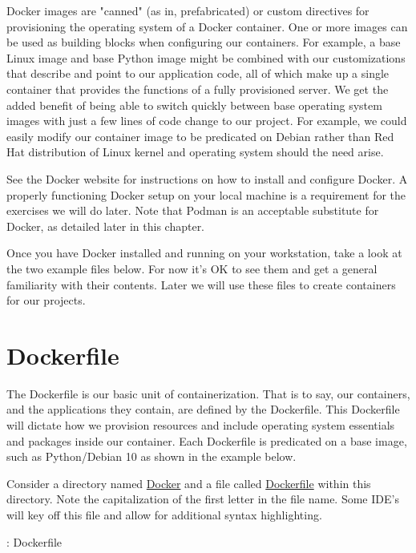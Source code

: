 \justify
Docker images are "canned" (as in, prefabricated) or custom directives
for provisioning the operating system of a Docker container. One or more
images can be used as building blocks when configuring our containers.
For example, a base Linux image and base Python image might be combined
with our customizations that describe and point to our application code,
all of which make up a single container that provides the functions of
a fully provisioned server. We get the added
benefit of being able to switch quickly between base operating system
images with just a few lines of code change to our project. For example,
we could easily modify our container image to be predicated on Debian
rather than Red Hat distribution of Linux kernel and operating system
should the need arise.

\justify
See the Docker website for instructions on how to install and configure
Docker. A properly
functioning Docker setup on your local machine is a requirement for the
exercises we will do later. Note that Podman is an acceptable substitute
for Docker, as detailed later in this chapter.

\justify
Once you have Docker installed and running on your workstation, take a
look at the two example files below. For now it's OK to see them and get
a general familiarity with their contents. Later we will use these files
to create containers for our projects.

\section{Dockerfile}
\justify
The Dockerfile is our basic unit of containerization. That is to say,
our containers, and the applications they contain, are defined by the
Dockerfile. This Dockerfile will dictate how we provision resources and
include operating system essentials and packages inside our container.
Each Dockerfile is predicated on a base image, such as Python/Debian 10
as shown in the example below.

\justify
Consider a directory named
\href{https://github.com/hotpeppersec/rapid_secdev_framework/tree/master/docker}{Docker}
and a file called
\href{https://github.com/hotpeppersec/rapid_secdev_framework/blob/master/docker/Dockerfile}{Dockerfile}
within this directory. Note the capitalization of the first letter in the file name. Some IDE's will key off this file and allow for additional syntax highlighting.

\justify
\begin{mybox}{\thetcbcounter: Dockerfile}
  
\end{mybox}

